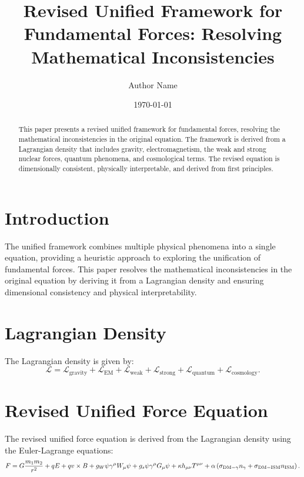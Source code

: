 \documentclass{article}
\title{Revised Unified Framework for Fundamental Forces: Resolving Mathematical Inconsistencies}
\author{Author Name}
\date{\today}
\begin{document}
\maketitle

\begin{abstract}
This paper presents a revised unified framework for fundamental forces, resolving the mathematical inconsistencies in the original equation. The framework is derived from a Lagrangian density that includes gravity, electromagnetism, the weak and strong nuclear forces, quantum phenomena, and cosmological terms. The revised equation is dimensionally consistent, physically interpretable, and derived from first principles.
\end{abstract}

\section{Introduction}
The unified framework combines multiple physical phenomena into a single equation, providing a heuristic approach to exploring the unification of fundamental forces. This paper resolves the mathematical inconsistencies in the original equation by deriving it from a Lagrangian density and ensuring dimensional consistency and physical interpretability.

\section{Lagrangian Density}
The Lagrangian density is given by:
\[
\mathcal{L} = \mathcal{L}_{\text{gravity}} + \mathcal{L}_{\text{EM}} + \mathcal{L}_{\text{weak}} + \mathcal{L}_{\text{strong}} + \mathcal{L}_{\text{quantum}} + \mathcal{L}_{\text{cosmology}}.
\]

\section{Revised Unified Force Equation}
The revised unified force equation is derived from the Lagrangian density using the Euler-Lagrange equations:
\begin{equation}
F = G\frac{m_1 m_2}{r^2} + qE + qv \times B + g_W \psi \gamma^\mu W_\mu \psi \\ \linebreak
+ g_s \psi \gamma^\mu G_\mu \psi + \kappa h_{\mu\nu} T^{\mu\nu} \\ \linebreak
+ \alpha \left( \sigma_{\text{DM}-\gamma} n_{\gamma} + \sigma_{\text{DM}-\text{ISM}} n_{\text{ISM}} \right).
\end{equation}
\end{document}
